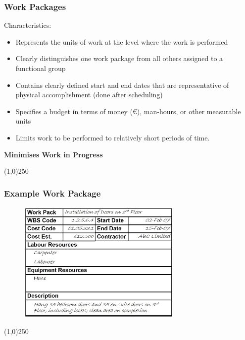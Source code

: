\begin{frame}
\frametitle{Work Packages}
Characteristics:
\begin{itemize}
	\item Represents the units of work at the level where the work is performed
	\item Clearly distinguishes one work package from all others assigned to a functional group
	\item Contains clearly defined start and end dates that are representative of physical accomplishment (done after scheduling)
	\item Specifies a budget in terms of money (\euro), man-hours, or other measurable units
	\item Limits work to be performed to relatively short periods of time.
\end{itemize}
\textbf{Minimises Work in Progress}
\end{frame}\begin{center}\line(1,0){250}\end{center}



\begin{frame}
\frametitle{Example Work Package}
\begin{figure}
	\centering
		\includegraphics[width = 8cm]{images/pheader.jpg}
	\label{fig:pheader}
\end{figure}
\end{frame}\begin{center}\line(1,0){250}\end{center}



